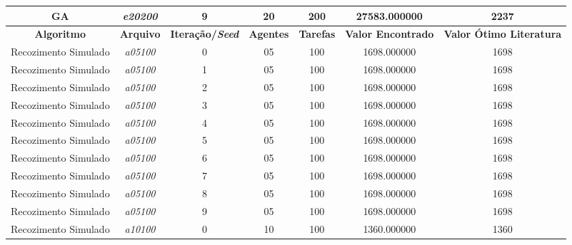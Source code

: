 {\begin{longtable}{cc|c|cc|cc}
			GA                 & \textit{e20200}    & 9                               & 20               & 200              & 27583.000000                          & 2237 \\ \hline
			\hline \hline
			\textbf{Algoritmo} & \textbf{Arquivo}   & \textbf{Iteração/\textit{Seed}} & \textbf{Agentes} & \textbf{Tarefas} & \textbf{Valor Encontrado} & \textbf{Valor Ótimo Literatura} \\ \hline
			Recozimento Simulado & \textit{a05100}    & 0                               & 05               & 100              & 1698.000000                          & 1698 \\ 
			Recozimento Simulado & \textit{a05100}    & 1                               & 05               & 100              & 1698.000000                          & 1698 \\ 
			Recozimento Simulado & \textit{a05100}    & 2                               & 05               & 100              & 1698.000000                          & 1698 \\ 
			Recozimento Simulado & \textit{a05100}    & 3                               & 05               & 100              & 1698.000000                          & 1698 \\ 
			Recozimento Simulado & \textit{a05100}    & 4                               & 05               & 100              & 1698.000000                          & 1698 \\ 
			Recozimento Simulado & \textit{a05100}    & 5                               & 05               & 100              & 1698.000000                          & 1698 \\ 
			Recozimento Simulado & \textit{a05100}    & 6                               & 05               & 100              & 1698.000000                          & 1698 \\ 
			Recozimento Simulado & \textit{a05100}    & 7                               & 05               & 100              & 1698.000000                          & 1698 \\ 
			Recozimento Simulado & \textit{a05100}    & 8                               & 05               & 100              & 1698.000000                          & 1698 \\ 
			Recozimento Simulado & \textit{a05100}    & 9                               & 05               & 100              & 1698.000000                          & 1698 \\ \hline
			Recozimento Simulado & \textit{a10100}    & 0                               & 10               & 100              & 1360.000000                          & 1360 \\ 

\end{longtable}}
